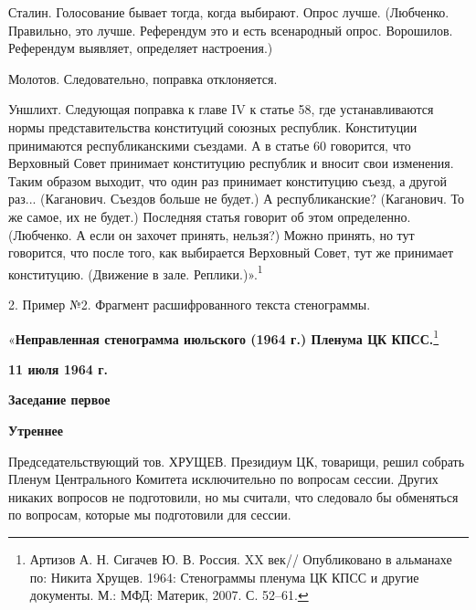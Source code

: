 \documentclass{kursa4}
\begin{document}
  \textcolor[rgb]{0.70980394,0.1764706,0.13725491}{Сталин.}{
  Голосование бывает тогда, когда выбирают. Опрос лучше.
  (}\textcolor[rgb]{0.70980394,0.1764706,0.13725491}{Любченко.}{
  Правильно, это лучше. Референдум это и есть всенародный
  опрос.}\textcolor[rgb]{0.70980394,0.1764706,0.13725491}{
  Ворошилов.}{ Референдум выявляет, определяет
  настроения.)}

  \textcolor[rgb]{0.70980394,0.1764706,0.13725491}{Молотов.}{
  Следовательно, поправка отклоняется.}

  \textcolor[rgb]{0.70980394,0.1764706,0.13725491}{Уншлихт.}{
  Следующая поправка к главе IV к статье 58, где устанавливаются нормы
  представительства конституций союзных республик. Конституции
  принимаются республиканскими съездами. А в статье 60 говорится, что
  Верховный Совет принимает конституцию республик и вносит свои
  изменения. Таким образом выходит, что один раз принимает конституцию
  съезд, а другой раз...
  (}\textcolor[rgb]{0.70980394,0.1764706,0.13725491}{Каганович.}{
  Съездов больше не будет.) А республиканские?
  (}\textcolor[rgb]{0.70980394,0.1764706,0.13725491}{Каганович.}{
  То же самое, их не будет.) Последняя статья говорит об этом
  определенно.
  (}\textcolor[rgb]{0.70980394,0.1764706,0.13725491}{Любченко.}{
  А если он захочет принять, нельзя?) Можно принять, но тут говорится,
  что после того, как выбирается Верховный Совет, тут же принимает
  конституцию.
  (}\textcolor[rgb]{0.70980394,0.1764706,0.13725491}{Движение в зале.
  Реплики.}{)».}{\textsuperscript{1}}


  \bigskip

  2. Пример №2. Фрагмент расшифрованного текста стенограммы.


  \bigskip

  «\textbf{{Неправленная стенограмма июльского (1964 г.)
  Пленума ЦК КПСС.}}\footnote{ Артизов А. Н. Сигачев Ю. В. Россия. XX
  век// Опубликовано в альманахе по: Никита Хрущев. 1964: Стенограммы
  пленума ЦК КПСС и другие документы. М.: МФД: Материк, 2007. С. 52–61.}

  \textbf{{11 июля 1964 г.}}

  \textbf{{Заседание первое}}

  \textbf{{Утреннее}}

  \textcolor[rgb]{0.77254903,0.0,0.043137256}{Председательствующий тов.
  ХРУЩЕВ.}{ Президиум ЦК, товарищи, решил собрать Пленум
  Центрального Комитета исключительно по вопросам сессии. Других никаких
  вопросов не }{подготовили, но мы считали, что
  следовало бы обменяться по вопросам, которые мы подготовили для
  сессии.}
\end{document}
